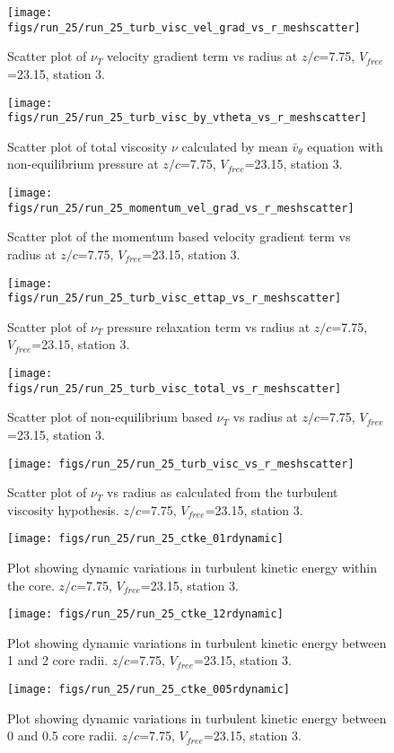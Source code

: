 \begin{figure}[H]
\centering
\texttt{[image: figs/run\_25/run\_25\_turb\_visc\_vel\_grad\_vs\_r\_meshscatter]}
\caption{Scatter plot of $\nu_T$ velocity gradient term vs radius at $z/c$=7.75, $V_{free}$=23.15, station 3.}
\end{figure}


\begin{figure}[H]
\centering
\texttt{[image: figs/run\_25/run\_25\_turb\_visc\_by\_vtheta\_vs\_r\_meshscatter]}
\caption{Scatter plot of total viscosity $\nu$ calculated by mean $\bar{v}_{\theta}$ equation with non-equilibrium pressure at $z/c$=7.75, $V_{free}$=23.15, station 3.}
\end{figure}


\begin{figure}[H]
\centering
\texttt{[image: figs/run\_25/run\_25\_momentum\_vel\_grad\_vs\_r\_meshscatter]}
\caption{Scatter plot of the momentum based velocity gradient term vs radius at $z/c$=7.75, $V_{free}$=23.15, station 3.}
\end{figure}


\begin{figure}[H]
\centering
\texttt{[image: figs/run\_25/run\_25\_turb\_visc\_ettap\_vs\_r\_meshscatter]}
\caption{Scatter plot of $\nu_T$ pressure relaxation term vs radius at $z/c$=7.75, $V_{free}$=23.15, station 3.}
\end{figure}


\begin{figure}[H]
\centering
\texttt{[image: figs/run\_25/run\_25\_turb\_visc\_total\_vs\_r\_meshscatter]}
\caption{Scatter plot of non-equilibrium based $\nu_T$ vs radius at $z/c$=7.75, $V_{free}$=23.15, station 3.}
\end{figure}


\begin{figure}[H]
\centering
\texttt{[image: figs/run\_25/run\_25\_turb\_visc\_vs\_r\_meshscatter]}
\caption{Scatter plot of $\nu_T$ vs radius as calculated from the turbulent viscosity hypothesis. $z/c$=7.75, $V_{free}$=23.15, station 3.}
\end{figure}


\begin{figure}[H]
\centering
\texttt{[image: figs/run\_25/run\_25\_ctke\_01rdynamic]}
\caption{Plot showing dynamic variations in turbulent kinetic energy within the core. $z/c$=7.75, $V_{free}$=23.15, station 3.}
\end{figure}


\begin{figure}[H]
\centering
\texttt{[image: figs/run\_25/run\_25\_ctke\_12rdynamic]}
\caption{Plot showing dynamic variations in turbulent kinetic energy between 1 and 2 core radii. $z/c$=7.75, $V_{free}$=23.15, station 3.}
\end{figure}


\begin{figure}[H]
\centering
\texttt{[image: figs/run\_25/run\_25\_ctke\_005rdynamic]}
\caption{Plot showing dynamic variations in turbulent kinetic energy between 0 and 0.5 core radii. $z/c$=7.75, $V_{free}$=23.15, station 3.}
\end{figure}


